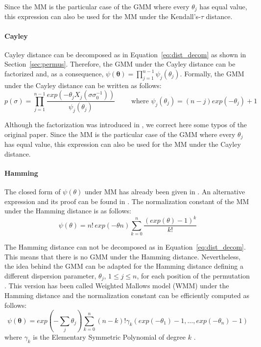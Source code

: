 \documentclass[article,nojss]{jss}
\begin{document}
Since the MM is the particular case of the GMM where every $\theta_j$ has equal value, this expression can also be used for the MM under the Kendall's-$\tau$ distance. 

\paragraph{Cayley}
Cayley distance can be decomposed as in Equation~\eqref{eq:dist_decom} as shown in Section~\ref{sec:permus}. Therefore, the GMM under the Cayley distance can be factorized and, as a consequence, $\psi(\boldsymbol\theta) = \prod _{j=1}^{n-1}\psi_j(\theta_j) $. Formally, the GMM under the Cayley distance can be written as follows:
\begin{equation}
	p(\sigma) =  \prod _{j=1}^{n-1} \frac{exp(-\theta_j X_j(\sigma \sigma_0^{-1})) }{\psi_j(\theta_j)} 
  \quad\quad \text{ where } \psi_j(\theta_j) = (n-j) exp(-\theta_j ) +1   
  \label{eq:gmm_cayley}
\end{equation}

Although the factorization was introduced in \cite{gMallows}, we correct here some typos of the original paper. Since the MM is the particular case of the GMM where every $\theta_j$ has equal value, this expression can also be used for the MM under the Cayley distance. 

\paragraph{Hamming}
The closed form of $\psi(\theta)$ under MM has already been given in \cite{gMallows}. An alternative expression and its proof can be found in \cite{Irurozki2014a}. The normalization constant of the MM under the Hamming distance is as follows:
\begin{equation*}
  \psi( \theta)  =  n! \, exp(-\theta n) \sum_{k=0}^n \frac{(exp(\theta)-1)^k}{ k!} 
\end{equation*}

The Hamming distance can not be decomposed as in Equation~\eqref{eq:dist_decom}. This means that there is no GMM under the Hamming distance. Nevertheless, the idea behind the GMM can be adapted for the Hamming distance defining a different dispersion parameter, $\theta_j$, $1 \leq j\leq n$, for each position of the permutation \citep{Irurozki2014a}. This version has been called Weighted Mallows model (WMM) under the Hamming distance and the normalization constant can be efficiently computed as follows:
\begin{equation*}
	\psi(\boldsymbol \theta) = exp(-\sum_j  \theta_j ) \sum_{k=0}^{n} (n-k)!   \gamma_{k}(exp(-\theta_1)-1, \ldots, exp(-\theta_n)-1)
\end{equation*}
\noindent where $\gamma_k$ is the Elementary Symmetric Polynomial of degree $k$ \citep{Irurozki2014a}.
\end{document}
